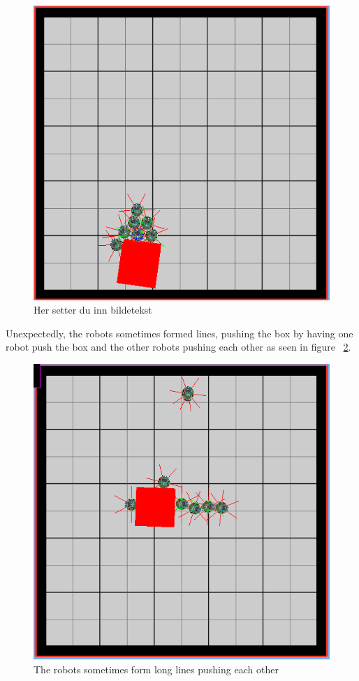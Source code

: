 \documentclass[titlepage,norsk,a4paper,10pt]{article}
\begin{document}
\begin{figure}[p]
\centering
\includegraphics[scale=0.5]{figs/observation1}
\caption{Her setter du inn bildetekst}
\label{fig:o1}
\end{figure}

Unexpectedly, the robots sometimes formed lines, pushing the box by having one robot push the box and the other robots pushing each other as seen in figure ~\ref{fig:o0}.

\begin{figure}[p]
\centering
\includegraphics[scale=0.5]{figs/observation0.png}
\caption{The robots sometimes form long lines pushing each other}
\label{fig:o0}
\end{figure}
\end{document}
